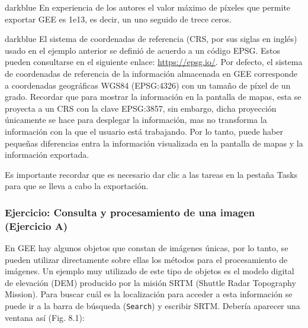 \documentclass[
  12pt,
  letterpaper,
  twoside]{book}
\begin{document}
\begin{bluebox2}

\begin{awesomeblock}{5pt}{\faLightbulb}{darkblue}
En experiencia de los autores el valor máximo de píxeles que permite exportar GEE es 1e13, es decir, un uno seguido de trece ceros.

\end{awesomeblock}

\end{bluebox2}

\begin{bluebox2}

\begin{awesomeblock}{5pt}{\faLightbulb}{darkblue}
El sistema de coordenadas de referencia (CRS, por sus siglas en inglés) usado en el ejemplo anterior se definió de acuerdo a un código EPSG. Estos pueden consultarse en el siguiente enlace: \url{https://epsg.io/}. Por defecto, el sistema de coordenadas de referencia de la información almacenada en GEE corresponde a coordenadas geográficas WGS84 (EPSG:4326) con un tamaño de píxel de un grado. Recordar que para mostrar la información en la pantalla de mapas, esta se proyecta a un CRS con la clave EPSG:3857, sin embargo, dicha proyección únicamente se hace para desplegar la información, mas no transforma la información con la que el usuario está trabajando. Por lo tanto, puede haber pequeñas diferencias entra la información visualizada en la pantalla de mapas y la información exportada.

\end{awesomeblock}

\end{bluebox2}

Es importante recordar que es necesario dar clic a las tareas en la pestaña Tasks para que se lleva a cabo la exportación.

\hypertarget{ejercicio-consulta-y-procesamiento-de-una-imagen-ejercicio-a}{%
\subsubsection{Ejercicio: Consulta y procesamiento de una imagen (Ejercicio A)}\label{ejercicio-consulta-y-procesamiento-de-una-imagen-ejercicio-a}}

En GEE hay algunos objetos que constan de imágenes únicas, por lo tanto, se pueden utilizar directamente sobre ellas los métodos para el procesamiento de imágenes. Un ejemplo muy utilizado de este tipo de objetos es el modelo digital de elevación (DEM) producido por la misión SRTM (Shuttle Radar Topography Mission). Para buscar cuál es la localización para acceder a esta información se puede ir a la barra de búsqueda (\texttt{Search}) y escribir SRTM. Debería aparecer una ventana así (Fig. 8.1):
\end{document}
